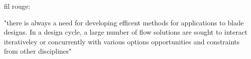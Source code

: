 
fil rouge:

"there is always a need for developing efficent methods for applications 
to blade designs. In a design cycle, a large number of flow solutions
are sought to interact iterativeley or concurrently with various options
opportunities and constraints from other disciplines"